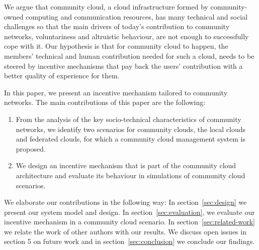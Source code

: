 We argue that community cloud, a cloud infrastructure formed by community-owned computing and communication resources, has many technical and social challenges so that the main drivers of today's contribution to community networks, voluntariness and altruistic behaviour, are not enough to successfully cope with it. 
Our hypothesis is that for community cloud to happen, the  members' technical and human contribution needed for such a cloud, needs to be steered by incentive mechanisms that pay back the users' contribution with a better quality of experience for them.

In this paper, we present an incentive mechanism tailored to community networks.
The main contributions of this paper are the following:
\begin{enumerate}
    \item From the analysis of the key socio-technical characteristics of community networks, we identify two scenarios for community clouds, the local clouds and federated clouds, for which a community cloud management system is proposed.
    \item We design an incentive mechanism that is part of the community cloud architecture and evaluate its behaviour in simulations of community cloud scenarios. 
\end{enumerate}


We elaborate our contributions in the following way: In section~\ref{sec:design} we present our system model and design.
In section~\ref{sec:evaluation}, we evaluate our incentive mechanism in a community cloud scenario.
In section~\ref{sec:related-work} we relate the work of other authors with our results. We discuss open issues in section 5 on future work and in section~\ref{sec:conclusion} we conclude our findings.
